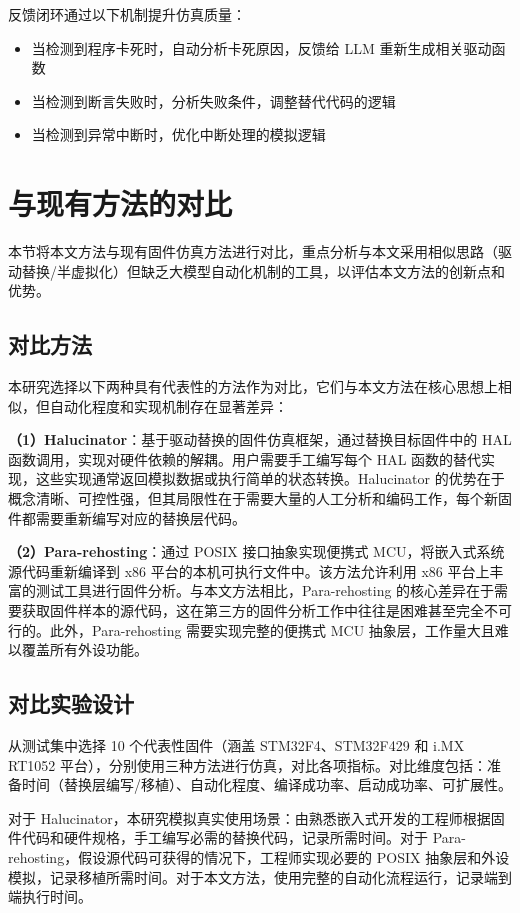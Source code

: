 反馈闭环通过以下机制提升仿真质量：
\begin{itemize}
    \item 当检测到程序卡死时，自动分析卡死原因，反馈给 LLM 重新生成相关驱动函数
    \item 当检测到断言失败时，分析失败条件，调整替代代码的逻辑
    \item 当检测到异常中断时，优化中断处理的模拟逻辑
\end{itemize}

\section{与现有方法的对比}
\label{sec:compare}

本节将本文方法与现有固件仿真方法进行对比，重点分析与本文采用相似思路（驱动替换/半虚拟化）但缺乏大模型自动化机制的工具，以评估本文方法的创新点和优势。

\subsection{对比方法}

本研究选择以下两种具有代表性的方法作为对比，它们与本文方法在核心思想上相似，但自动化程度和实现机制存在显著差异：

\textbf{（1）Halucinator}：基于驱动替换的固件仿真框架，通过替换目标固件中的 HAL 函数调用，实现对硬件依赖的解耦。用户需要手工编写每个 HAL 函数的替代实现，这些实现通常返回模拟数据或执行简单的状态转换。Halucinator 的优势在于概念清晰、可控性强，但其局限性在于需要大量的人工分析和编码工作，每个新固件都需要重新编写对应的替换层代码。

\textbf{（2）Para-rehosting}：通过 POSIX 接口抽象实现便携式 MCU，将嵌入式系统源代码重新编译到 x86 平台的本机可执行文件中。该方法允许利用 x86 平台上丰富的测试工具进行固件分析。与本文方法相比，Para-rehosting 的核心差异在于需要获取固件样本的源代码，这在第三方的固件分析工作中往往是困难甚至完全不可行的。此外，Para-rehosting 需要实现完整的便携式 MCU 抽象层，工作量大且难以覆盖所有外设功能。

\subsection{对比实验设计}

从测试集中选择 10 个代表性固件（涵盖 STM32F4、STM32F429 和 i.MX RT1052 平台），分别使用三种方法进行仿真，对比各项指标。对比维度包括：准备时间（替换层编写/移植）、自动化程度、编译成功率、启动成功率、可扩展性。

对于 Halucinator，本研究模拟真实使用场景：由熟悉嵌入式开发的工程师根据固件代码和硬件规格，手工编写必需的替换代码，记录所需时间。对于 Para-rehosting，假设源代码可获得的情况下，工程师实现必要的 POSIX 抽象层和外设模拟，记录移植所需时间。对于本文方法，使用完整的自动化流程运行，记录端到端执行时间。

